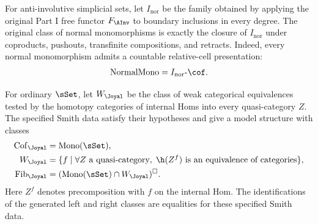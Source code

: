 \begin{resultblock}
\begin{theorem}
For anti-involutive simplicial sets, let $I_{\mathrm{nor}}$ be the family obtained by applying the original Part I free functor $F_{\AInv}$ to boundary inclusions in every degree.
The original class of normal monomorphisms is exactly the closure of $I_{\mathrm{nor}}$ under coproducts, pushouts, transfinite compositions, and retracts.
Indeed, every normal monomorphism admits a countable relative-cell presentation:
\begin{align}
\operatorname{NormalMono}
  = I_{\mathrm{nor}}\text{-}\cof.
\end{align}
\end{theorem}
\end{resultblock}

\begin{resultblock}
\begin{theorem}
For ordinary $\sSet$, let $W_{\Joyal}$ be the class of weak categorical equivalences tested by the homotopy categories of internal Homs into every quasi-category $Z$.
The specified Smith data satisfy their hypotheses and give a model structure with classes
\begin{align}
\Cof_{\Joyal} &= \operatorname{Mono}(\sSet), \\
W_{\Joyal} &= \{f\mid \forall Z\text{ a quasi-category},\;
       \h(Z^f)\text{ is an equivalence of categories}\}, \\
\Fib_{\Joyal} &= (\operatorname{Mono}(\sSet)\cap W_{\Joyal})^{\square}.
\end{align}
Here $Z^f$ denotes precomposition with $f$ on the internal Hom.
The identifications of the generated left and right classes are equalities for these specified Smith data.
\end{theorem}
\end{resultblock}

